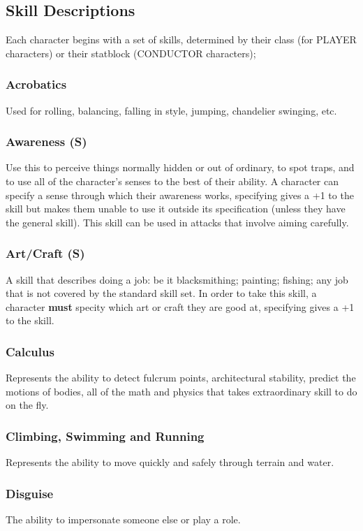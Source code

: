 \subsection{Skill Descriptions}
Each character begins with a set of skills, determined by their class (for PLAYER characters) or their statblock (CONDUCTOR characters);
\begin{multicols}{2}
\subsubsection*{Acrobatics}
Used for rolling, balancing, falling in style, jumping, chandelier swinging, etc.
\subsubsection*{Awareness (S)}
Use this to perceive things normally hidden or out of ordinary, to spot traps, and to use all of the character's senses to the best of their ability. A character can specify a sense through which their awareness works, specifying gives a +1 to the skill but makes them unable to use it outside its specification (unless they have the general skill). This skill can be used in attacks that involve aiming carefully.
\subsubsection*{Art/Craft (S)}
A skill that describes doing a job: be it blacksmithing; painting; fishing; any job that is not covered by the standard skill set. In order to take this skill, a character \textbf{must} specity which art or craft they are good at, specifying gives a +1 to the skill.
\subsubsection*{Calculus}
Represents the ability to detect fulcrum points, architectural stability, predict the motions of bodies, all of the math and physics that takes extraordinary skill to do on the fly.
\subsubsection*{Climbing, Swimming and Running}
Represents the ability to move quickly and safely through terrain and water.
\subsubsection*{Disguise}
The ability to impersonate someone else or play a role.

\end{multicols}

